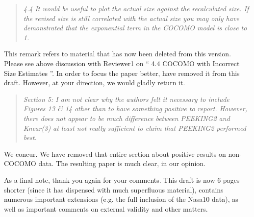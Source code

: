 \documentclass[smallcondesed]{svjour3}
\begin{document}
\begin{quote}{\em 4.4 It would be useful to plot the actual size against the recalculated size. If the revised size is still correlated with the actual size you may only have demonstrated that the exponential term in the COCOMO model is close to 1.}\end{quote}

\noindent
This remark refers to material that has now been deleted from this version.
Please see above discussion with Reviewer1 on `` 4.4 COCOMO with Incorrect Size Estimates ''.
In order to focus the paper better,  have removed it from this draft. However, at your direction, we would gladly return it.


\begin{quote}{\em Section 5: I am not clear why the authors felt it necessary to include Figures 13 \& 14 other than to have something positive to report. However, there does not appear to be much difference between PEEKING2 and Knear(3) at least not really sufficient to claim that PEEKING2 performed best.}\end{quote}

\noindent We concur. We have removed that entire section about positive results on non-COCOMO data.
The resulting paper is much clear, in our opinion.

As a final note, thank you again for your comments. This draft is now 6 pages shorter (since it has dispensed
with much superfluous material), contains numerous important extensions (e.g. the full inclusion of the Nasa10 data),
as well as important comments on external validity and other matters.
\newpage
\end{document}
